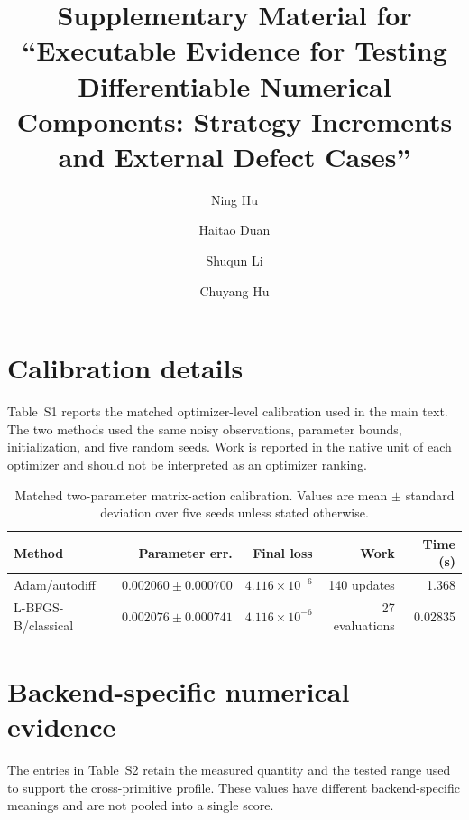 \documentclass[preprint,12pt]{elsarticle}
\begin{document}
\begin{frontmatter}
\title{Supplementary Material for ``Executable Evidence for Testing Differentiable Numerical Components: Strategy Increments and External Defect Cases''}
\author{Ning Hu}
\author{Haitao Duan}
\author{Shuqun Li}
\author{Chuyang Hu}
\end{frontmatter}

\section{Calibration details}
Table~S1 reports the matched optimizer-level calibration used in the main text. The two methods used the same noisy observations, parameter bounds, initialization, and five random seeds. Work is reported in the native unit of each optimizer and should not be interpreted as an optimizer ranking.

\begin{table}[htbp]
\centering
\caption{Matched two-parameter matrix-action calibration. Values are mean $\pm$ standard deviation over five seeds unless stated otherwise.}
\label{tab:s1}
\small
\setlength{\tabcolsep}{3.5pt}
\begin{tabular}{@{}lrrrr@{}}
\toprule
Method & Parameter err. & Final loss & Work & Time (s)\\
\midrule
Adam/autodiff & $0.002060\pm0.000700$ & $4.116\times10^{-6}$ & 140 updates & 1.368\\
L-BFGS-B/classical & $0.002076\pm0.000741$ & $4.116\times10^{-6}$ & 27 evaluations & 0.02835\\
\bottomrule
\end{tabular}
\end{table}

\section{Backend-specific numerical evidence}
The entries in Table~S2 retain the measured quantity and the tested range used to support the cross-primitive profile. These values have different backend-specific meanings and are not pooled into a single score.
\end{document}

